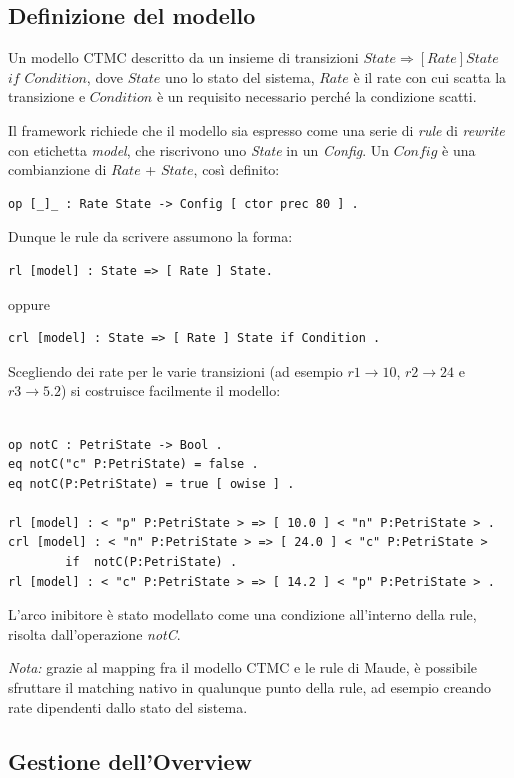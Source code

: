 \subsection{Definizione del modello}

Un modello CTMC descritto da un insieme di transizioni $State \Longrightarrow [Rate] State$ $if$
$Condition$, dove $State$ uno lo stato del sistema, $Rate$ è il rate con cui
scatta la transizione e $Condition$ è un requisito necessario perché la
condizione scatti.

Il framework richiede che il modello sia espresso come una serie di \emph{rule}
di \emph{rewrite} con etichetta \emph{model}, che riscrivono uno
\emph{State} in un \emph{Config}. Un $Config$ è una combianzione di $Rate$ +
$State$, così definito:
\begin{Verbatim}[fontsize=\small]
op [_]_ : Rate State -> Config [ ctor prec 80 ] .
\end{Verbatim}
Dunque le rule da scrivere assumono la forma:
\begin{Verbatim}[fontsize=\small]
rl [model] : State => [ Rate ] State.
\end{Verbatim}
oppure
\begin{Verbatim}[fontsize=\small]
crl [model] : State => [ Rate ] State if Condition .
\end{Verbatim}
Scegliendo dei rate per le varie transizioni (ad esempio $r1 \rightarrow 10$,
$r2 \rightarrow 24$ e $r3 \rightarrow 5.2$) si costruisce facilmente il modello:

\begin{Verbatim}[fontsize=\small]

op notC : PetriState -> Bool .
eq notC("c" P:PetriState) = false .
eq notC(P:PetriState) = true [ owise ] .
	
rl [model] : < "p" P:PetriState > => [ 10.0 ] < "n" P:PetriState > .
crl [model] : < "n" P:PetriState > => [ 24.0 ] < "c" P:PetriState >
        if  notC(P:PetriState) .
rl [model] : < "c" P:PetriState > => [ 14.2 ] < "p" P:PetriState > .

\end{Verbatim}
L'arco inibitore è stato modellato come una condizione all'interno della rule,
risolta dall'operazione \emph{notC}.

\emph{Nota:} grazie al mapping fra il modello CTMC e le rule di Maude, è
possibile sfruttare il matching nativo in qualunque punto della rule, ad esempio
creando rate dipendenti dallo stato del sistema.

\subsection{Gestione dell'Overview}

